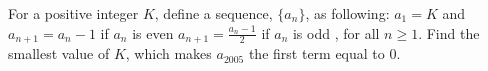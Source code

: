 For a positive integer $K$, define a sequence, $\{a_n\}$, as following: $a_1 = K$ and
$a_{n+1} =a_n -1$ if $a_n$ is even
$a_{n+1} =\frac{a_n - 1}{2}$ if $a_n$ is odd ,  for all $n \ge 1$.
Find the smallest value of $K$, which makes $a_{2005}$ the first term equal to $0$.